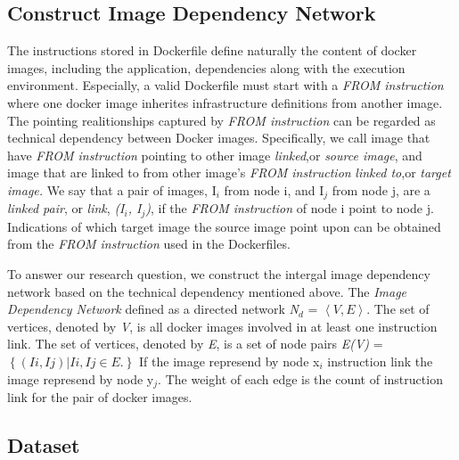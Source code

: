 \documentclass[sigconf]{acmart}
\begin{document}
\subsection{Construct Image Dependency Network}
The instructions stored in Dockerfile define naturally the content of docker images, including the application, dependencies along with the execution environment. Especially, a valid Dockerfile must start with a  \emph{FROM instruction} where one docker image inherites infrastructure definitions from another image. The pointing realitionships captured by \emph{FROM instruction} can be regarded as technical dependency between Docker images. Specifically, we call image that have \emph{FROM instruction} pointing to other image \emph{linked},or \emph{source image}, and image that are linked to from other image's \emph{FROM instruction} \emph{linked to},or \emph{target image.} We say that a pair of images, I$_i$ from node i, and I$_j$ from node j, are a \emph{linked pair}, or \emph{link}, \emph{(I$_i$, I$_j$)}, if the \emph{FROM instruction} of node i point to node j. Indications of which target image the source image point upon can be obtained from the \emph{FROM instruction} used in the Dockerfiles.

To answer our research question, we construct the intergal image dependency network based on the technical dependency mentioned above. The \emph{Image Dependency Network} defined as a directed network \emph{N$_d$} = $\left \langle V,E \right \rangle$. The set of vertices, denoted by \emph{V}, is all docker images involved in at least one instruction link. The set of vertices, denoted by \emph{E}, is a set of node pairs \emph{E(V)} = $\left\{ 	\left( Ii, Ij \right)|Ii,Ij \in E. \right\}$ If the image represend by node x$_i$ instruction link the image represend by node y$_j$. The weight of each edge is the count of instruction link for the pair of docker images.\\




\subsection{Dataset}


\end{document}
